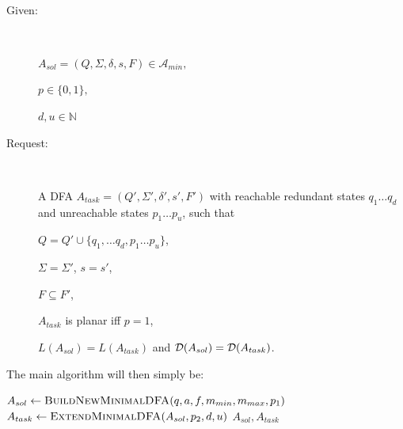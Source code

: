 \begin{definition}[ExtendMinimalDFA] \label{ch:1:def:ExtendMinimalDFA} $ $
	\begin{description}
		
		\item[Given:] $ $
		
		$A_{sol} = (Q, \Sigma, \delta, s, F) \in \mathcal{A}_{min},$
		
		$p \in \{0,1\},$
		
		$d, u \in \mathbb{N}$
		\item[Request:] $ $
		
		A DFA $A_{task} = (Q', \Sigma', \delta', s', F')$ with reachable redundant states $q_1 \ldots q_d$ and unreachable states $p_1 \ldots p_u$, such that
		
		$Q = Q' \cup \{ q_1, \ldots q_d, p_1 \ldots p_u \}$,
		
		$\Sigma = \Sigma'$, $s = s'$,
		
		$F \subseteq F'$,
		
		$A_{task}$ is planar iff $p = 1$,
		
		$L(A_{sol}) = L(A_{task})$ and $\mathcal{D}(A_{sol}) = \mathcal{D}(A_{task})$.
	\end{description}
\end{definition}

\noindent The main algorithm will then simply be:
\vspace{0.2cm}
\begin{algorithmic}[1]
	\State $A_{sol} \gets \textsc{BuildNewMinimalDFA}(q, a, f, m_{min}, m_{max}, p_1)$
	\State $A_{task} \gets \textsc{ExtendMinimalDFA}(A_{sol}, p_2, d, u)$
	\State \Return $A_{sol}, A_{task}$
	\EndFunction
\end{algorithmic}


